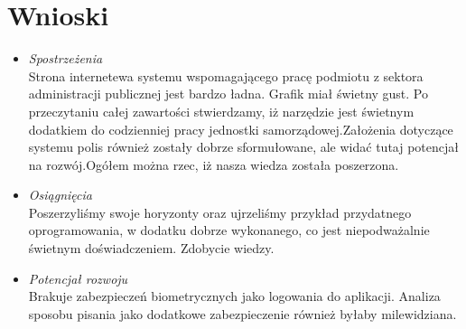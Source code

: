 \documentclass[12pt,a4paper]{article}
\begin{document}
\section{Wnioski}
\begin{itemize}
\item \textit{Spostrzeżenia} \\
Strona internetewa systemu wspomagającego pracę podmiotu z sektora administracji publicznej jest bardzo ładna. Grafik miał świetny gust. Po przeczytaniu całej zawartości stwierdzamy, iż narzędzie jest świetnym dodatkiem do codzienniej pracy jednostki samorządowej.Założenia dotyczące systemu polis również zostały dobrze sformułowane, ale widać tutaj potencjał na rozwój.Ogółem można rzec, iż nasza wiedza została poszerzona.
\item \textit{Osiągnięcia}\\
Poszerzyliśmy swoje horyzonty oraz ujrzeliśmy przykład przydatnego oprogramowania, w dodatku dobrze wykonanego, co jest niepodważalnie świetnym doświadczeniem. Zdobycie wiedzy.
\item \textit{Potencjał rozwoju}\\
Brakuje zabezpieczeń biometrycznych jako logowania do aplikacji. Analiza sposobu pisania jako dodatkowe zabezpieczenie również byłaby milewidziana.
\end{itemize}
\end{document}
